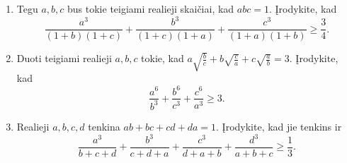 \begin{enumerate}
  \item {} Tegu $a,b,c$ bus tokie teigiami
    realieji skaičiai, kad $abc=1$. Įrodykite, kad
    $$\frac{a^3}{(1+b)(1+c)}+\frac{b^3}{(1+c)(1+a)}+\frac{c^3}{(1+a)(1+b)}\geq\frac{3}{4}.$$
  \item Duoti teigiami realieji $a,b,c$ tokie, kad
    $a\sqrt{\frac{b}{c}}+b\sqrt{\frac{c}{a}}+c\sqrt{\frac{a}{b}}=3$.
    Įrodykite, kad
    $$\frac{a^6}{b^3}+\frac{b^6}{c^3}+\frac{c^6}{a^3}\geq3.$$
  \item {} Realieji $a,b,c,d$ tenkina
    $ab+bc+cd+da=1$. Įrodykite, kad jie tenkins ir
    $$\frac{a^3}{b+c+d}+\frac{b^3}{c+d+a}+\frac{c^3}{d+a+b}+\frac{d^3}{a+b+c}\geq\frac{1}{3}.$$

\end{enumerate}

